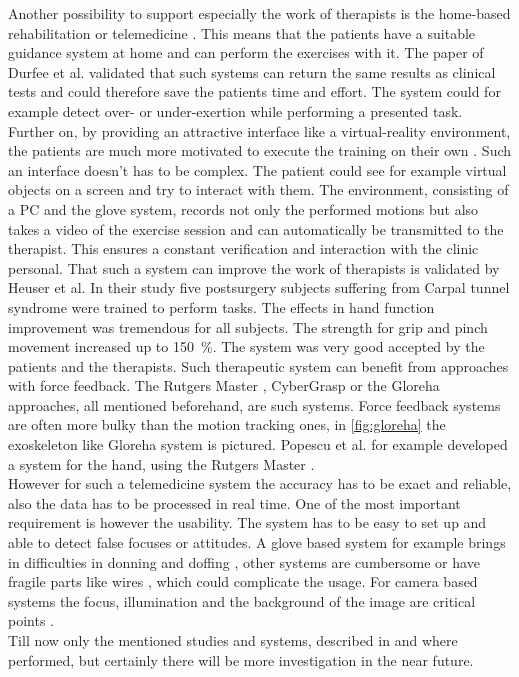 Another possibility to support especially the work of therapists is the home-based rehabilitation or telemedicine \cite{metcalf2013markerless}. This means that the patients have a suitable guidance system at home and can perform the exercises with it. The paper of Durfee et al. validated that such systems can return the same results as clinical tests and could therefore save the patients time and effort. The system could for example detect over- or under-exertion while performing a presented task. Further on, by providing an attractive interface like a virtual-reality environment, the patients are much more motivated to execute the training on their own \cite{popescu2000virtual}. Such an interface doesn't has to be complex. The patient could see for example virtual objects on a screen and try to interact with them. The environment, consisting of a PC and the glove system, records not only the performed motions but also takes a video of the exercise session and can automatically be transmitted to the therapist. This ensures a constant verification and interaction with the clinic personal. That such a system can improve the work of therapists is validated by Heuser et al. In their study five postsurgery subjects suffering from Carpal tunnel syndrome were trained to perform tasks. The effects in hand function improvement was tremendous for all subjects. The strength for grip and pinch movement increased up to \SI{150}{\percent}. The system was very good accepted by the patients and the therapists. Such therapeutic system can benefit from approaches with force feedback. The Rutgers Master , CyberGrasp or the Gloreha approaches, all mentioned beforehand, are such systems. Force feedback systems are often more bulky than the motion tracking ones, in \ref{fig:gloreha} the exoskeleton like Gloreha system is pictured. Popescu et al. \cite{popescu2000virtual} for example developed a system for the hand, using the Rutgers Master .\\ 
However for such a telemedicine system the accuracy has to be exact and reliable, also the data has to be processed in real time. One of the most important requirement is however the usability. The system has to be easy to set up and able to detect false focuses or attitudes. A glove based system for example brings in difficulties in donning and doffing \cite{metcalf2013markerless}, other systems are cumbersome or have fragile parts like wires \cite{bouzit2002rutgers}, which could complicate the usage. For camera based systems the focus, illumination and the background of the image are critical points \cite{ionescu2005dynamic}.\\
Till now only the mentioned studies and systems, described in \cite{heuser2007telerehabilitation} and \cite{popescu2000virtual} where performed, but certainly there will be more investigation in the near future.\\


